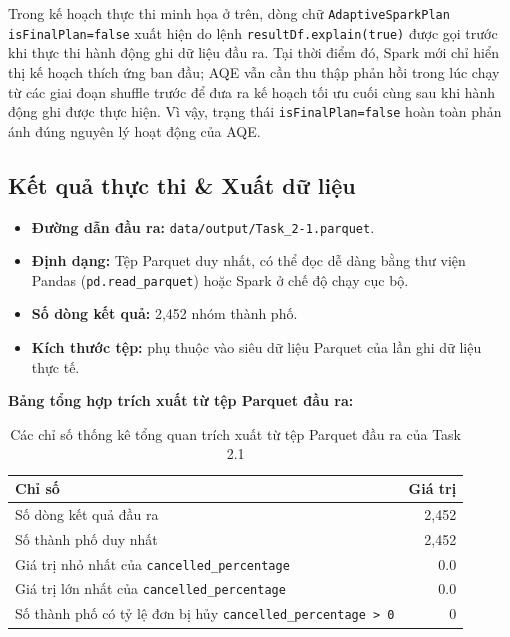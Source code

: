Trong kế hoạch thực thi minh họa ở trên, dòng chữ \texttt{AdaptiveSparkPlan isFinalPlan=false} xuất hiện do lệnh \texttt{resultDf.explain(true)} được gọi trước khi thực thi hành động ghi dữ liệu đầu ra. Tại thời điểm đó, Spark mới chỉ hiển thị kế hoạch thích ứng ban đầu; AQE vẫn cần thu thập phản hồi trong lúc chạy từ các giai đoạn shuffle trước để đưa ra kế hoạch tối ưu cuối cùng sau khi hành động ghi được thực hiện. Vì vậy, trạng thái \texttt{isFinalPlan=false} hoàn toàn phản ánh đúng nguyên lý hoạt động của AQE.

\subsection{Kết quả thực thi \& Xuất dữ liệu}

\begin{itemize}
    \item \textbf{Đường dẫn đầu ra:} \texttt{data/output/Task\_2-1.parquet}.
    \item \textbf{Định dạng:} Tệp Parquet duy nhất, có thể đọc dễ dàng bằng thư viện Pandas (\texttt{pd.read\_parquet}) hoặc Spark ở chế độ chạy cục bộ.
    \item \textbf{Số dòng kết quả:} 2,452 nhóm thành phố.
    \item \textbf{Kích thước tệp:} phụ thuộc vào siêu dữ liệu Parquet của lần ghi dữ liệu thực tế.
\end{itemize}

\textbf{Bảng tổng hợp trích xuất từ tệp Parquet đầu ra:}
\begin{table}[H]
\centering
\begin{tabular}{lr}
\toprule
\textbf{Chỉ số} & \textbf{Giá trị} \\
\midrule
Số dòng kết quả đầu ra & 2,452 \\
Số thành phố duy nhất & 2,452 \\
Giá trị nhỏ nhất của \texttt{cancelled\_percentage} & 0.0 \\
Giá trị lớn nhất của \texttt{cancelled\_percentage} & 0.0 \\
Số thành phố có tỷ lệ đơn bị hủy \texttt{cancelled\_percentage > 0} & 0 \\
\bottomrule
\end{tabular}
\caption{Các chỉ số thống kê tổng quan trích xuất từ tệp Parquet đầu ra của Task 2.1}
\label{tab:task2_1_summary_metrics}
\end{table}

